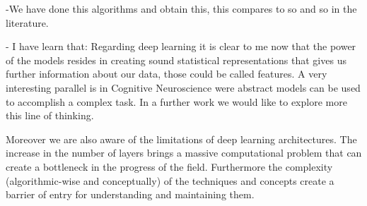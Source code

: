 \documentclass[11pt,a4paper]{article}
\begin{document}
-We have done this algorithms and obtain this, this compares to so and so in the literature.

- I have learn that: 
Regarding deep learning it is clear to me now that the power of the models resides in creating sound statistical representations that gives us further information about our data, those could be called features. A very interesting parallel is in Cognitive Neuroscience were abstract models can be used to accomplish a complex task. In a further work we would like to explore more this line of thinking. 

Moreover we are also aware of the limitations of deep learning architectures. The increase in the number of layers brings a massive computational problem that can create a bottleneck in the progress of the field. Furthermore the complexity (algorithmic-wise and conceptually) of the techniques and concepts create a barrier of entry for understanding and maintaining them.




\end{document}
